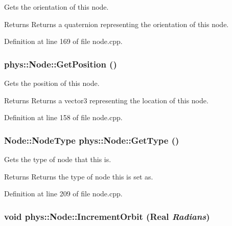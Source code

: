 Gets the orientation of this node. 

\begin{DoxyReturn}{Returns}
Returns a quaternion representing the orientation of this node. 
\end{DoxyReturn}


Definition at line 169 of file node.cpp.

\hypertarget{classphys_1_1Node_adbb895705afa97bd5d824f0abf59e11a}{
\subsubsection[{GetPosition}]{ phys::Node::GetPosition ()}}
\label{d0/ddc/classphys_1_1Node_adbb895705afa97bd5d824f0abf59e11a}


Gets the position of this node. 

\begin{DoxyReturn}{Returns}
Returns a vector3 representing the location of this node. 
\end{DoxyReturn}


Definition at line 158 of file node.cpp.

\hypertarget{classphys_1_1Node_aee8632b4db2accd810afd096247252c2}{
\subsubsection[{GetType}]{\setlength{\rightskip}{0pt plus 5cm}Node::NodeType phys::Node::GetType ()}}
\label{d0/ddc/classphys_1_1Node_aee8632b4db2accd810afd096247252c2}


Gets the type of node that this is. 

\begin{DoxyReturn}{Returns}
Returns the type of node this is set as. 
\end{DoxyReturn}


Definition at line 209 of file node.cpp.

\hypertarget{classphys_1_1Node_a93fbb2b20f3cab180f7bdd39299c252e}{
\subsubsection[{IncrementOrbit}]{\setlength{\rightskip}{0pt plus 5cm}void phys::Node::IncrementOrbit ({\bf Real} {\em Radians})}}
\label{d0/ddc/classphys_1_1Node_a93fbb2b20f3cab180f7bdd39299c252e}


